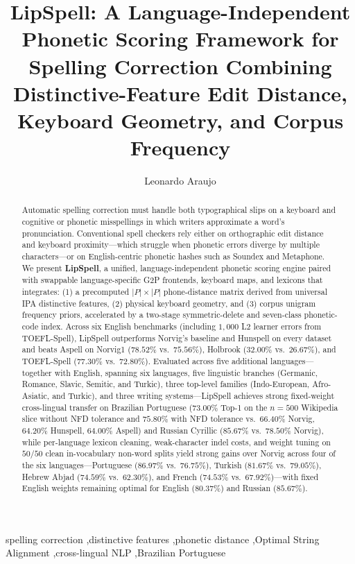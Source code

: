 \documentclass[preprint,12pt,authoryear]{elsarticle}
\begin{document}
\begin{frontmatter}

\title{LipSpell: A Language-Independent Phonetic Scoring Framework for Spelling Correction Combining Distinctive-Feature Edit Distance, Keyboard Geometry, and Corpus Frequency}

\author[ufsj]{Leonardo Araujo}

\begin{abstract}
Automatic spelling correction must handle both typographical slips on a keyboard and cognitive or phonetic misspellings in which writers approximate a word's pronunciation. Conventional spell checkers rely either on orthographic edit distance and keyboard proximity---which struggle when phonetic errors diverge by multiple characters---or on English-centric phonetic hashes such as Soundex and Metaphone. We present \textbf{LipSpell}, a unified, language-independent phonetic scoring engine paired with swappable language-specific G2P frontends, keyboard maps, and lexicons that integrates: (1) a precomputed $|P|\times|P|$ phone-distance matrix derived from universal IPA distinctive features, (2) physical keyboard geometry, and (3) corpus unigram frequency priors, accelerated by a two-stage symmetric-delete and seven-class phonetic-code index. Across six English benchmarks (including $1{,}000$ L2 learner errors from TOEFL-Spell), LipSpell outperforms Norvig's baseline and Hunspell on every dataset and beats Aspell on Norvig1 ($78.52\%$ vs.\ $75.56\%$), Holbrook ($32.00\%$ vs.\ $26.67\%$), and TOEFL-Spell ($77.30\%$ vs.\ $72.80\%$). Evaluated across five additional languages---together with English, spanning six languages, five linguistic branches (Germanic, Romance, Slavic, Semitic, and Turkic), three top-level families (Indo-European, Afro-Asiatic, and Turkic), and three writing systems---LipSpell achieves strong fixed-weight cross-lingual transfer on Brazilian Portuguese ($73.00\%$ Top-1 on the $n=500$ Wikipedia slice without NFD tolerance and $75.80\%$ with NFD tolerance vs.\ $66.40\%$ Norvig, $64.20\%$ Hunspell, $64.00\%$ Aspell) and Russian Cyrillic ($85.67\%$ vs.\ $78.50\%$ Norvig), while per-language lexicon cleaning, weak-character indel costs, and weight tuning on $50/50$ clean in-vocabulary non-word splits yield strong gains over Norvig across four of the six languages---Portuguese ($86.97\%$ vs.\ $76.75\%$), Turkish ($81.67\%$ vs.\ $79.05\%$), Hebrew Abjad ($74.59\%$ vs.\ $62.30\%$), and French ($74.53\%$ vs.\ $67.92\%$)---with fixed English weights remaining optimal for English ($80.37\%$) and Russian ($85.67\%$).
\end{abstract}

\begin{keyword}
spelling correction \sep distinctive features \sep phonetic distance \sep Optimal String Alignment \sep cross-lingual NLP \sep Brazilian Portuguese
\end{keyword}

\end{frontmatter}
\end{document}
